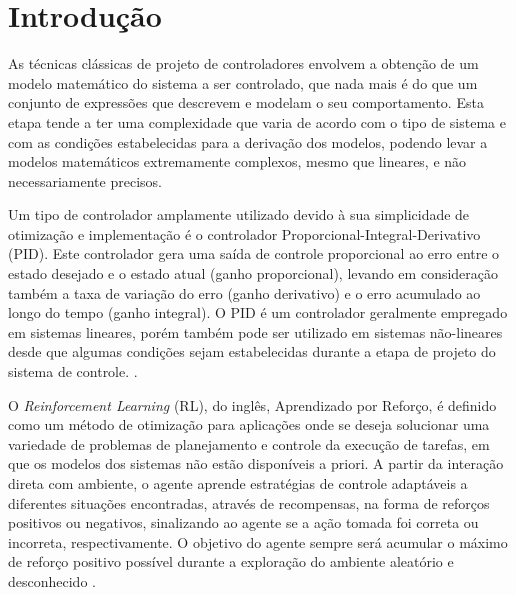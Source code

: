 \documentclass[a4paper]{ifacconf}
\begin{document}
\section{Introdução}

As técnicas clássicas de projeto de controladores envolvem a obtenção de um modelo matemático do sistema a ser controlado, que nada mais é do que um conjunto de expressões que descrevem e modelam o seu comportamento. Esta etapa tende a ter uma complexidade que varia de acordo com o tipo de sistema e com as condições estabelecidas para a derivação dos modelos, podendo levar a modelos matemáticos extremamente complexos, mesmo que lineares, e não necessariamente precisos. 

Um tipo de controlador amplamente utilizado devido à sua simplicidade de otimização e implementação é o controlador Proporcional-Integral-Derivativo (PID). Este controlador gera uma saída de controle proporcional ao erro entre o estado desejado e o estado atual (ganho proporcional), levando em consideração também a taxa de variação do erro (ganho derivativo) e o erro acumulado ao longo do tempo (ganho integral). O PID é um controlador geralmente empregado em sistemas lineares, porém também pode ser utilizado em sistemas não-lineares \citep{nonLinearPID} desde que algumas condições sejam estabelecidas durante a etapa de projeto do sistema de controle. \citep{pid_autotune_relay, pid_engine_tuning,embarcados_pid_1}.

O \emph{Reinforcement Learning} (RL), do inglês, Aprendizado por Reforço, é definido como um método de otimização para aplicações onde se deseja solucionar uma variedade de problemas de planejamento e controle da execução de tarefas, em que os modelos dos sistemas não estão disponíveis a priori. A partir da interação direta com ambiente, o agente aprende estratégias de controle adaptáveis a diferentes situações encontradas, através de recompensas, na forma de reforços positivos ou negativos, sinalizando ao agente se a ação tomada foi correta ou incorreta, respectivamente. O objetivo do agente sempre será acumular o máximo de reforço positivo possível durante a exploração do ambiente aleatório e desconhecido \citep{ql_pid_robotics,intro_to_rl,rl_rob_survey,ql_pid_robotics}.
\end{document}

